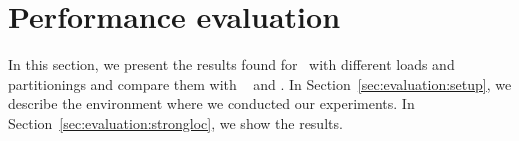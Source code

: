 \section{Performance evaluation}
\label{sec:experiments}

In this section, we present the results found for \appname\ with different loads and partitionings and compare them with
\ssmr{}~\cite{bezerra2014ssmr} and \dssmr.
In Section~\ref{sec:evaluation:setup}, we describe the environment where we conducted our experiments.
In Section~\ref{sec:evaluation:strongloc}, we show the results.


